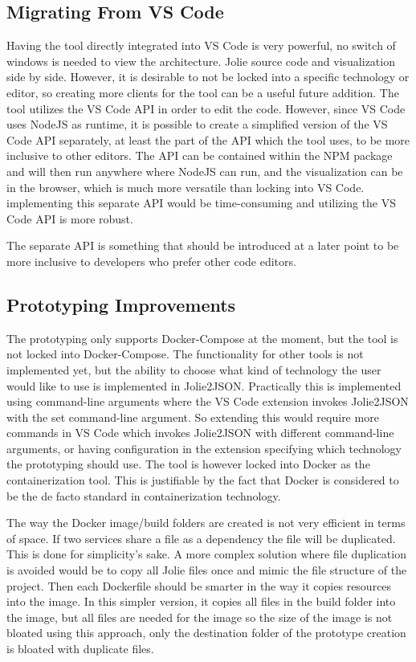 \subsection{Migrating From VS Code}
Having the tool directly integrated into VS Code is very powerful, no switch of windows is needed to view the architecture. Jolie source code and visualization side by side.
However, it is desirable to not be locked into a specific technology or editor, so creating more clients for the tool can be a useful future addition.
The tool utilizes the VS Code API in order to edit the code. However, since VS Code uses NodeJS as runtime, it is possible to create
a simplified version of the VS Code API separately, at least the part of the API which the tool uses, to be more inclusive to other editors.
The API can be contained within the NPM package and will then run anywhere where NodeJS can run, and the visualization can be in the browser, which is much more versatile than locking into VS Code.
implementing this separate API would be time-consuming and utilizing the VS Code API is more robust.

The separate API is something that should be introduced at a later point to be more inclusive to developers who prefer other code editors.

\subsection{Prototyping Improvements}
The prototyping only supports Docker-Compose at the moment, but the tool is not locked into Docker-Compose. The functionality for other tools is not implemented yet, but the ability to choose what kind of technology the user would like to use is implemented in Jolie2JSON.
Practically this is implemented using command-line arguments where the VS Code extension invokes Jolie2JSON with the set command-line argument. So extending this would require more commands in VS Code which invokes Jolie2JSON with different command-line arguments, or having
configuration in the extension specifying which technology the prototyping should use.
The tool is however locked into Docker as the containerization tool. This is justifiable by the fact that Docker is considered to be the de facto standard in containerization technology.

The way the Docker image/build folders are created is not very efficient in terms of space. If two services share a file as a dependency the file will be duplicated.
This is done for simplicity's sake. A more complex solution where file duplication is avoided would be to copy all Jolie files once and mimic the file structure of the project. 
Then each Dockerfile should be smarter in the way it copies resources into the image. In this simpler version, it copies all files in the build folder into the image, but all files are needed for the image so the size of the image is not bloated using this approach, only the destination folder of the prototype creation is bloated with duplicate files.


